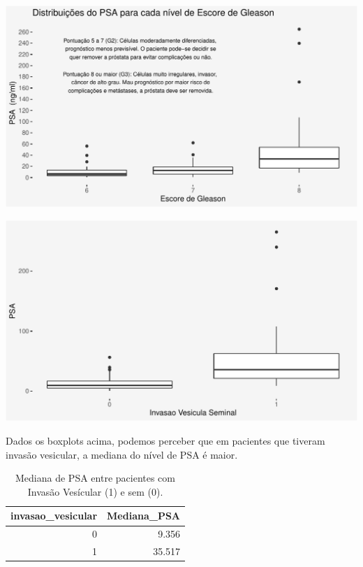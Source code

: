 \documentclass[runningheads]{llncs}\usepackage[]{graphicx}\usepackage[]{color}
\makeatletter
\def\maxwidth{ %
  \ifdim\Gin@nat@width>\linewidth
    \linewidth
  \else
    \Gin@nat@width
  \fi
}
\newenvironment{knitrout}{}{} %
\makeatother
\begin{document}
\begin{knitrout}
\color{fgcolor}
\includegraphics[width=\maxwidth]{figure/unnamed-chunk-9-1} 

\end{knitrout}
\begin{knitrout}
\color{fgcolor}
\includegraphics[width=\maxwidth]{figure/unnamed-chunk-10-1} 

\end{knitrout}
Dados os boxplots acima, podemos perceber que em pacientes que tiveram invasão vesicular, a mediana do nível de PSA é maior.

\begin{knitrout}
\color{fgcolor}\begin{table}

\caption{\label{tab:unnamed-chunk-11}Mediana de PSA entre pacientes com Invasão Vesícular (1) e sem (0).}
\centering
\begin{tabular}[t]{rr}
\toprule
invasao\_vesicular & Mediana\_PSA\\
\midrule
\rowcolor{gray!6}  0 & 9.356\\
1 & 35.517\\
\bottomrule
\end{tabular}
\end{table}


\end{knitrout}
\end{document}

